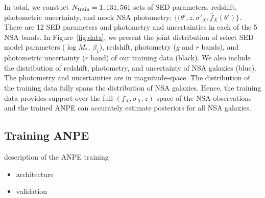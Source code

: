 In total, we constuct $N_{\rm train} = 1,131,561$ sets of SED parameters,
redshift, photometric uncertainty, and mock NSA photometry: 
$\{(\theta', z, \sigma'_X, \hat{f}_X(\theta') \}$.
There are 12 SED parameters and photometry and uncertainties in each of the 5
NSA bands. 
In Figure~\ref{fig:data}, we present the joint distribution of select SED model
parameters ($\log M_*$, $\beta_1$), redshift, photometry ($g$ and $r$ bands),
and photometric uncertainty ($r$ band) of our training data (black).
We also include the distribution of redshift, photometry, and uncertainty of
NSA galaxies (blue).
The photometry and uncertainties are in magnitude-space. 
The distribution of the training data fully spans the distribution of NSA
galaxies.
Hence, the training data provides support over the full $(f_X, \sigma_X, z)$
space of the NSA observations and the trained ANPE can accurately estimate
posteriors for all NSA galaxies. 

\subsection{Training ANPE} \label{sec:anpe}
description of the ANPE training
\begin{itemize}
    \item architecture
    \item validation 
\end{itemize}
